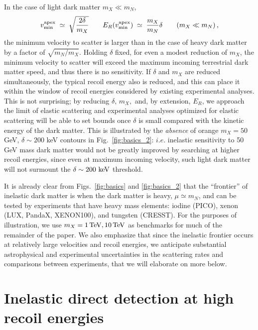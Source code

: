 \documentclass[11pt]{article}
\newcommand{\tev}{{\rm TeV}}
\begin{document}
In the case of light dark matter $m_X \ll m_N$,
\begin{equation}
v^{\rm apex}_{\rm min} \; \simeq \; \sqrt{\frac{2 \delta}{m_X}} \qquad 
E_R(v^{\rm apex}_{\rm min}) \; \simeq \; \frac{m_X}{m_N} \delta \qquad (m_X \ll m_N) \, , 
\end{equation}
the minimum velocity to scatter is larger than in the
case of heavy dark matter by a factor of $\sqrt{m_N/m_X}$.
Holding $\delta$ fixed, for even a modest reduction of $m_X$,
the minimum velocity to scatter will exceed the maximum
incoming terrestrial dark matter speed, and thus there is 
no sensitivity.  If $\delta$ and $m_X$ are reduced simultaneously, the typical recoil energy
also is reduced, and this can place it within 
the window of recoil energies considered by existing experimental analyses.
This is not surprising; by reducing $\delta,\,m_X,$ and, by extension, $E_R$, we approach 
the limit of elastic scattering and experimental analyses optimized 
for elastic scattering will be able to set bounds
once $\delta$ is small compared with the kinetic
energy of the dark matter.  This is illustrated by
the \emph{absence} of orange $m_X = 50$ GeV, $\delta \sim 200$ keV contours in Fig.~\ref{fig:basics_2}: $i.e.$ inelastic sensitivity to 50 GeV mass dark matter would not be greatly improved by searching at higher recoil energies, since even at maximum incoming velocity, such light dark matter will not surmount the $\delta \sim 200 ~{\rm keV}$ threshold. 

It is already clear from Figs.~\ref{fig:basics} and \ref{fig:basics_2} 
that the ``frontier'' of inelastic dark matter is when the dark matter
is heavy, $\mu \simeq m_N$, and can be tested by experiments that have 
heavy mass elements: iodine (PICO), xenon (LUX, PandaX, XENON100), 
and tungsten (CRESST).  For the purposes of illustration,
we use $m_X = 1\, \tev, 10\, \tev$ as benchmarks for much of
the remainder of the paper.    
We also emphasize that since the inelastic frontier
occurs at relatively large velocities and recoil energies,
we anticipate substantial astrophysical and experimental uncertainties 
in the scattering rates and comparisons between experiments,
that we will elaborate on more below. 

\section{Inelastic direct detection at high recoil energies}
\label{sec:rate}
\end{document}
